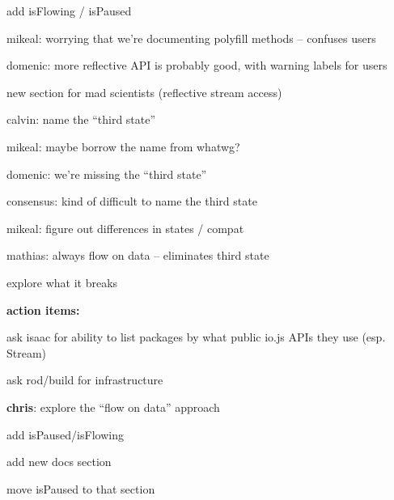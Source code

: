 \begin{DoxyItemize}
\item add is\+Flowing / is\+Paused
\item mikeal\+: worrying that we’re documenting polyfill methods – confuses users
\item domenic\+: more reflective A\+PI is probably good, with warning labels for users
\item new section for mad scientists (reflective stream access)
\item calvin\+: name the “third state”
\item mikeal\+: maybe borrow the name from whatwg?
\item domenic\+: we’re missing the “third state”
\item consensus\+: kind of difficult to name the third state
\item mikeal\+: figure out differences in states / compat
\item mathias\+: always flow on data – eliminates third state
\begin{DoxyItemize}
\item explore what it breaks
\end{DoxyItemize}
\end{DoxyItemize}

{\bfseries action items\+:}
\begin{DoxyItemize}
\item ask isaac for ability to list packages by what public io.\+js A\+P\+Is they use (esp. Stream)
\item ask rod/build for infrastructure
\item {\bfseries chris}\+: explore the “flow on data” approach
\item add is\+Paused/is\+Flowing
\item add new docs section
\item move is\+Paused to that section 
\end{DoxyItemize}